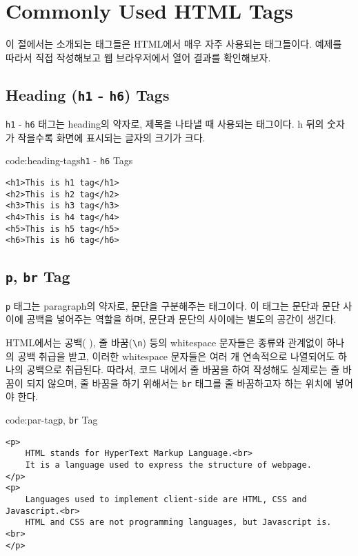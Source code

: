 \section{Commonly Used HTML Tags} \label{sect:commonly-used-html-tags}

이 절에서는 소개되는 태그들은 HTML에서 매우 자주 사용되는 태그들이다. 예제를 따라서 직접 작성해보고 웹 브라우저에서 열어 결과를 확인해보자.

\subsection*{Heading (\texttt{h1} - \texttt{h6}) Tags}
\texttt{h1} - \texttt{h6} 태그는 heading의 약자로, 제목을 나타낼 때 사용되는 태그이다. h 뒤의 숫자가 작을수록 화면에 표시되는 글자의 크기가 크다.

\begin{codeenv}{code:heading-tags}{\texttt{h1} - \texttt{h6} Tags}\begin{verbatim}
<h1>This is h1 tag</h1>
<h2>This is h2 tag</h2>
<h3>This is h3 tag</h3>
<h4>This is h4 tag</h4>
<h5>This is h5 tag</h5>
<h6>This is h6 tag</h6>
\end{verbatim}
\end{codeenv}

\subsection*{\texttt{p}, \texttt{br} Tag}
\texttt{p} 태그는 paragraph의 약자로, 문단을 구분해주는 태그이다. 이 태그는 문단과 문단 사이에 공백을 넣어주는 역할을 하며, 문단과 문단의 사이에는 별도의 공간이 생긴다.

HTML에서는 공백( ), 줄 바꿈(\verb|\n|) 등의 whitespace 문자들은 종류와 관계없이 하나의 공백 취급을 받고, 이러한 whitespace 문자들은 여러 개 연속적으로 나열되어도 하나의 공백으로 취급된다. 따라서, 코드 내에서 줄 바꿈을 하여 작성해도 실제로는 줄 바꿈이 되지 않으며, 줄 바꿈을 하기 위해서는 \texttt{br} 태그를 줄 바꿈하고자 하는 위치에 넣어야 한다.

\begin{codeenv}{code:par-tag}{\texttt{p}, \texttt{br} Tag}\begin{verbatim}
<p>
    HTML stands for HyperText Markup Language.<br>
    It is a language used to express the structure of webpage.
</p>
<p>
    Languages used to implement client-side are HTML, CSS and Javascript.<br>
    HTML and CSS are not programming languages, but Javascript is. <br>
</p>
\end{verbatim}
\end{codeenv}

